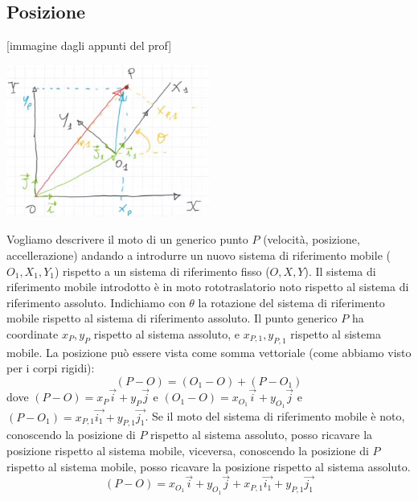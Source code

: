\subsection{Posizione}
[immagine dagli appunti del prof]
\begin{center}
    \includegraphics[height=5cm]{../lezione3/img3.JPG}
\end{center}
Vogliamo descrivere il moto di un generico punto $P$ (velocità, posizione, accellerazione) andando a introdurre un nuovo sistema di riferimento mobile ($O_1, X_1, Y_1$) rispetto a un sistema di riferimento fisso ($O, X, Y$).\newline
Il sistema di riferimento mobile introdotto è in moto rototraslatorio noto rispetto al sistema di riferimento assoluto.\newline
Indichiamo con $\theta$ la rotazione del sistema di riferimento mobile rispetto al sistema di riferimento assoluto.\newline
\newline 
Il punto generico $P$ ha coordinate $x_P, y_P$ rispetto al sistema assoluto, e $x_{P,1}, y_{P,1}$ rispetto al sistema mobile. \newline
\newline
La posizione può essere vista come somma vettoriale (come abbiamo visto per i corpi rigidi): 
\[
    (P-O) = (O_1 - O) + (P-O_1)
\]
dove $(P-O) = x_P \vec{i} + y_P \vec{j}$ e $(O_1 - O) = x_{O_1} \vec{i} + y_{O_1} \vec{j}$ e $(P-O_1) = x_{P,1} \vec{i_1} + y_{P,1} \vec{j_1}$. Se il moto del sistema di riferimento mobile è noto, conoscendo la posizione di $P$ rispetto al sistema assoluto, posso ricavare la posizione rispetto al sistema mobile, viceversa, conoscendo la posizione di $P$ rispetto al sistema mobile, posso ricavare la posizione rispetto al sistema assoluto.
\[
    (P-O) = x_{O_1}\vec{i} + y_{O_1}\vec{j} + x_{P,1} \vec{i_1} + y_{P,1} \vec{j_1}
\]
